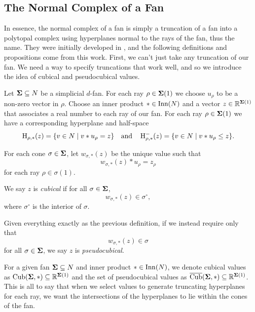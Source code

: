 \documentclass[12pt,oneside]{../../sfsuthesis}
\begin{document}
\subsection{The Normal Complex of a Fan}
In essence, the normal complex of a fan is simply a truncation of a fan into a polytopal complex using hyperplanes normal to the rays of the fan, thus the name.
They were initially developed in \cite{nathansonTropicalFansNormal2023}, and the following definitions and propositions come from this work.
First, we can't just take any truncation of our fan.
We need a way to specify truncations that work well, and so we introduce the idea of cubical and pseudocubical values.

\begin{definition}\th\label{def:cubical}
    Let \( \bm{\Sigma} \subseteq N \) be a simplicial \( d \)-fan.
    For each ray \( \rho \in \bm{\Sigma}(1) \) we choose \( u_\rho \) to be a non-zero vector in \( \rho \).
    Choose an inner product \( \ast \in \operatorname{Inn}(N) \) and a vector \( z \in \mathbb{R}^{\bm{\Sigma}(1)} \) that associates a real number to each ray of our fan.
    For each ray \( \rho \in \bm{\Sigma}(1) \) we have a corresponding hyperplane and half-space
    \[
        \operatorname{H}_{\rho, \ast}(z) = \{ v \in N \; | \; v \ast u_\rho = z \}
        \quad \text{and} \quad
        \operatorname{H}^{-}_{\rho, \ast}(z) = \{ v \in N \; | \; v \ast u_\rho \leq z \}.
    \]

    For each cone \( \sigma \in \bm{\Sigma} \), let \( w_{\sigma,\ast}(z) \) be the unique value such that
    \[
        w_{\sigma,\ast}(z) \ast u_\rho = z_\rho
    \]
    for each ray \(\rho \in \sigma(1)\).

    We say \( z \) is \emph{cubical} if for all \( \sigma \in \bm{\Sigma} \),
    \[
        w_{\sigma, \ast}(z)  \in \sigma^\circ,
    \]
    where \( \sigma^\circ \) is the interior of \( \sigma \).
\end{definition}
\begin{definition}[Pseudocubical]\th\label{def:pseudocubical}
    Given everything exactly as the previous definition, if we instead require only that
    \[
        w_{\sigma, \ast}(z) \in \sigma
    \]
    for all \( \sigma \in \bm{\Sigma} \), we say \( z \) is \emph{pseudocubical}.
\end{definition}
For a given fan \( \bm{\Sigma} \subseteq N \) and inner product \( \ast \in \operatorname{Inn}(N) \), we denote cubical values as \( \operatorname{Cub}(\bm{\Sigma}, \ast) \subseteq \mathbb{R}^{\bm{\Sigma}(1)} \) and the set of pseudocubical values as \( \operatorname{\overline{Cub}}(\bm{\Sigma}, \ast) \subseteq \mathbb{R}^{\bm{\Sigma}(1)} \).
This is all to say that when we select values to generate truncating hyperplanes for each ray, we want the intersections of the hyperplanes to lie within the cones of the fan.
\end{document}
